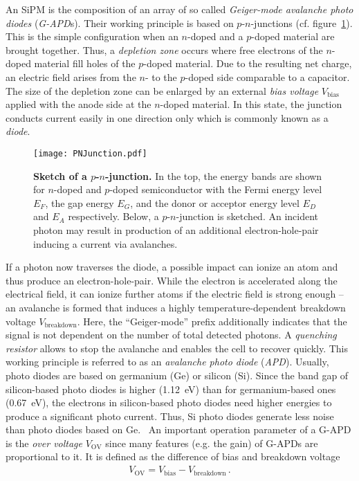 An SiPM is the composition of an array of so called \textit{Geiger-mode avalanche photo diodes} (\mbox{\textit{G-APD}s}). Their working principle is based on $p$-$n$-junctions (cf. figure~\ref{sipm:pn_junction}). This is the simple configuration when an $n$-doped and a $p$-doped material are brought together. Thus, a \textit{depletion zone} occurs where free electrons of the $n$-doped material fill holes of the $p$-doped material. Due to the resulting net charge, an electric field arises from the $n$- to the $p$-doped side comparable to a capacitor. The size of the depletion zone can be enlarged by an external \textit{bias voltage} $V_\text{bias}$ applied with the anode side at the $n$-doped material. In this state, the junction conducts current easily in one direction only which is commonly known as a \textit{diode}.~\cite{pn:simon}\\

\begin{figure}[H]
	\centering
	\texttt{[image: PNJunction.pdf]}
	\caption[Sketch of a $p$-$n$-junction]{\textbf{Sketch of a $p$-$n$-junction.} \cite{iceact:camera} In the top, the energy bands are shown for $n$-doped and $p$-doped semiconductor with the Fermi energy level $E_F$, the gap energy $E_G$, and the donor or acceptor energy level $E_D$ and $E_A$ respectively. Below, a $p$-$n$-junction is sketched. An incident photon may result in production of an additional electron-hole-pair inducing a current via avalanches.}
	\label{sipm:pn_junction}	
\end{figure}

If a photon now traverses the diode, a possible impact can ionize an atom and thus produce an electron-hole-pair. While the electron is accelerated along the electrical field, it can ionize further atoms if the electric field is strong enough -- an avalanche is formed that induces a highly temperature-dependent breakdown voltage $V_\text{breakdown}$. Here, the \enquote{Geiger-mode} prefix additionally indicates that the signal is not dependent on the number of total detected photons. A \textit{quenching resistor} allows to stop the avalanche and enables the cell to recover quickly. This working principle is referred to as an \textit{avalanche photo diode} (\textit{APD}). Usually, photo diodes are based on germanium (Ge) or silicon (Si). Since the band gap of silicon-based photo diodes is higher (\SI{1.12}{\electronvolt}) than for germanium-based ones (\SI{0.67}{\electronvolt}), the electrons in silicon-based photo diodes need higher energies to produce a significant photo current. Thus, Si photo diodes generate less noise than photo diodes based on Ge.~\cite{sipm:renker_lorenz} An important operation parameter of a G-APD is the \textit{over voltage} $V_\text{OV}$ since many features (e.g. the gain) of G-APDs are proportional to it. It is defined as the difference of bias and breakdown voltage~\cite{sipm:renker_lorenz}
\begin{align}
	V_\text{OV} = V_\text{bias} - V_\text{breakdown}\,.
\end{align}\\


